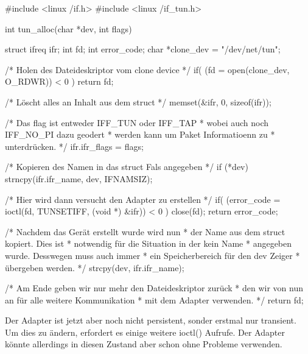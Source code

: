 \begin{program}[H]
    \begin{CppCode}
        #include <linux /if.h>
        #include <linux /if_tun.h>
        
        int tun_alloc(char *dev, int flags) {
          struct ifreq ifr;
          int fd;
          int error_code;
          char *clone_dev = "/dev/net/tun";
        
           /* Holen des Dateideskriptor vom clone device */
           if( (fd = open(clone_dev, O_RDWR)) < 0 ) {
             return fd;
           }
        
           /* Löscht alles an Inhalt aus dem struct */
           memset(&ifr, 0, sizeof(ifr));
        
           /* Das flag ist entweder IFF_TUN oder IFF_TAP
            * wobei auch noch IFF_NO_PI dazu geodert 
            * werden kann um Paket Informatioenn zu 
            * unterdrücken.
            */
           ifr.ifr_flags = flags;   
        
           /* Kopieren des Namen in das struct Fals angegeben */
           if (*dev) {
             strncpy(ifr.ifr_name, dev, IFNAMSIZ);
           }
        
           /* Hier wird dann versucht den Adapter zu erstellen */
           if( (error_code = ioctl(fd, TUNSETIFF, (void *) &ifr)) < 0 ) {
             close(fd);
             return error_code;
           }
        
          /* Nachdem das Gerät erstellt wurde wird nun
           * der Name aus dem struct kopiert. Dies ist 
           * notwendig für die Situation in der kein Name
           * angegeben wurde. Desswegen muss auch immer 
           * ein Speicherbereich für den dev Zeiger 
           * übergeben werden.
           */
          strcpy(dev, ifr.ifr_name);
        
          /* Am Ende geben wir nur mehr den Dateideskriptor zurück 
           * den wir von nun an für alle weitere Kommunikation
           * mit dem Adapter verwenden.
           */
          return fd;
        }
    \end{CppCode}
\end{program}
\noindent
Der Adapter ist jetzt aber noch nicht persistent, sonder erstmal nur transient. Um dies zu ändern, erfordert es einige weitere ioctl() Aufrufe.  Der Adapter könnte allerdings in diesen Zustand aber schon ohne Probleme verwenden.
\\\\
